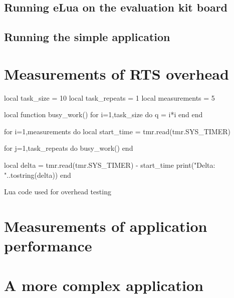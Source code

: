\subsection{Running eLua on the evaluation kit board}

\subsection{Running the simple application}

\section{Measurements of RTS overhead}
\label{sec:overhead_measure}

\begin{listing}[H]
\begin{luacode}
local task_size = 10
local task_repeats = 1
local measurements = 5

local function busy_work()
	for i=1,task_size do
		q = i*i
	end
end

for i=1,measurements do
	local start_time = tmr.read(tmr.SYS_TIMER)

	for j=1,task_repeats do
		busy_work()
	end

	local delta = tmr.read(tmr.SYS_TIMER) - start_time
	print("Delta: "..tostring(delta))
end
\end{luacode}
	\caption{Lua code used for overhead testing}
	\label{code:overhead}
\end{listing}

\section{Measurements of application performance}
\label{sec:performance_measure}

\section{A more complex application}
\label{sec:impl_complex_app}
